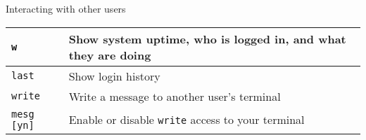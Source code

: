 \begin{block}{Interacting with other users}
  \begin{tabu} to 0.9\linewidth { X X }
    \texttt{w} & Show system uptime, who is logged in, and what they are doing \\ \hline
    \texttt{last} & Show login history \\ \hline
    \texttt{write} & Write a message to another user's terminal \\ \hline
    \texttt{mesg [yn]} & Enable or disable \texttt{write} access to your terminal
  \end{tabu}
\end{block}

